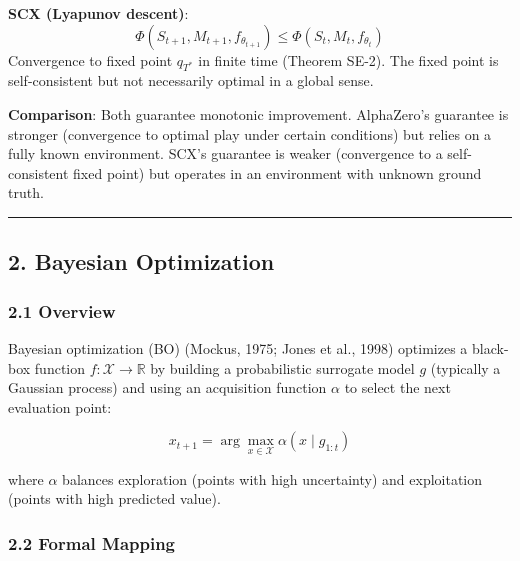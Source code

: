\documentclass[
  12pt,
]{ctexart}
\begin{document}
\textbf{SCX (Lyapunov descent)}:
\[\Phi(S_{t+1}, M_{t+1}, f_{\theta_{t+1}}) \leq \Phi(S_t, M_t, f_{\theta_t})\]
Convergence to fixed point \(q_{T^*}\) in finite time (Theorem SE-2).
The fixed point is self-consistent but not necessarily optimal in a
global sense.

\textbf{Comparison}: Both guarantee monotonic improvement. AlphaZero's
guarantee is stronger (convergence to optimal play under certain
conditions) but relies on a fully known environment. SCX's guarantee is
weaker (convergence to a self-consistent fixed point) but operates in an
environment with unknown ground truth.

\begin{center}\rule{0.5\linewidth}{0.5pt}\end{center}

\subsection{2. Bayesian Optimization}\label{bayesian-optimization}

\subsubsection{2.1 Overview}\label{overview-1}

Bayesian optimization (BO) (Mockus, 1975; Jones et al., 1998) optimizes
a black-box function \(f: \mathcal{X} \to \mathbb{R}\) by building a
probabilistic surrogate model \(g\) (typically a Gaussian process) and
using an acquisition function \(\alpha\) to select the next evaluation
point:

\[x_{t+1} = \arg\max_{x \in \mathcal{X}} \alpha(x \mid g_{1:t})\]

where \(\alpha\) balances exploration (points with high uncertainty) and
exploitation (points with high predicted value).

\subsubsection{2.2 Formal Mapping}\label{formal-mapping-1}
\end{document}
